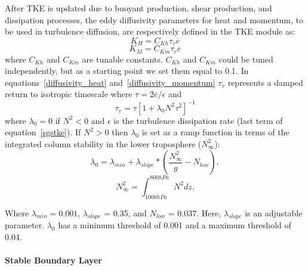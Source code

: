 After TKE is updated due to buoyant production, shear production, and dissipation processes, the eddy diffusivity parameters for heat and momentum, to be used in turbulence diffusion, are respectively defined in the TKE module as:
\begin{equation}
  K_{H}=C_{Kh} \tau_{v} \overline{e}
  \label{diffusivity_heat}
\end{equation}
%
\begin{equation}
  K_{M}=C_{Km} \tau_{v} \overline{e}
  \label{diffusivity_momentum}
\end{equation}
%
where $C_{Kh}$ and $C_{Km}$ are tunable constants.  $C_{Kh}$ and $C_{Km}$ could be tuned independently, but as a starting point we set them equal to 0.1.  In equations~\ref{diffusivity_heat} and~\ref{diffusivity_momentum} $\tau_{v}$ represents a damped return to isotropic timescale where $\tau=2\overline{e}/\epsilon$ and
%
\begin{equation}
  \tau_{v}=\tau\left[1+\lambda_{0}N^{2}\tau^{2}\right]^{-1}
  \label{tauv}
\end{equation}
% 
where $\lambda_{0}=0$ if $N^{2} < 0$ and $\epsilon$ is the turbulence dissipation rate (last term of equation~\ref{sgstke}).  If $N^{2} > 0$ then $\lambda_{0}$ is set as a ramp function in terms of the integrated column stability in the lower troposphere ($N_{\infty}^{2}$): 
%
\begin{equation}
  \lambda_{0} = \lambda_{min} + \lambda_{slope}*(\frac{N_{\infty}^{2}}{g} - N_{low}), 
  \label{lambda0}
\end{equation}
% 
%
\begin{equation}
  N_{\infty}^{2} = \int_{1000 hPa}^{800 hPa} N^{2} dz . 
  \label{int_N}
\end{equation}
%

Where $\lambda_{min} = 0.001$, $\lambda_{slope}$ = 0.35, and $N_{low}$ = 0.037.  Here, $\lambda_{slope}$ is an adjustable parameter.  $\lambda_{0}$ has a minimum threshold of 0.001 and a maximum threshold of 0.04.   

\paragraph{Stable Boundary Layer}

